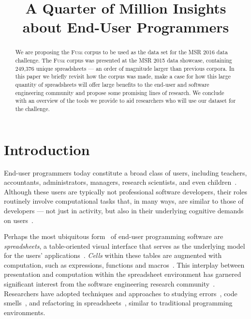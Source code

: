 \documentclass[conference]{IEEEtran}
\newcommand{\xlscount}{249,376}
\begin{document}
\title{A Quarter of Million Insights about End-User Programmers}

\author{
}


\maketitle

\begin{abstract}
We are proposing the \textsc{Fuse} corpus to be used as the data set for the MSR 2016 data challenge.
The \textsc{Fuse} corpus was presented at the MSR 2015 data showcase, containing \xlscount{} unique spreadsheets --- an order of magnitude larger than previous corpora.
In this paper we briefly revisit how the corpus was made, make a case for how this large quantity of spreadsheets will offer large benefits to the end-user and software engineering community and propose some promising lines of research.
We conclude with an overview of the tools we provide to aid researchers who will use our dataset for the challenge.

\end{abstract}


\IEEEpeerreviewmaketitle

\section{Introduction}

End-user programmers today constitute a broad class of users, including teachers, accountants, administrators, managers, research scientists, and even children~\cite{Ko2011}.
%
Although these users are typically not professional software developers, their roles routinely involve computational tasks that, in many ways, are similar to those of developers --- not just in activity, but also in their underlying cognitive demands on users~\cite{Blackwell2002}. 

Perhaps the most ubiquitous form~\cite{Scaffidi2005} of end-user programming software are \emph{spreadsheets}, a table-oriented visual interface that serves as the underlying model for the users' applications~\cite{Nardi1990}. \emph{Cells} within these tables are augmented with computation, such as expressions, functions and macros~\cite{Nardi1990}. 
This interplay between presentation and computation within the spreadsheet environment has garnered significant interest from the software engineering research community~\cite{Burnett2009}. 
Researchers have adopted techniques and approaches to studying errors~\cite{Powell2008}, code smells~\cite{Pinzger2012}, and refactoring in spreadsheets~\cite{Badame2012}, similar to traditional programming environments. 
\end{document}
